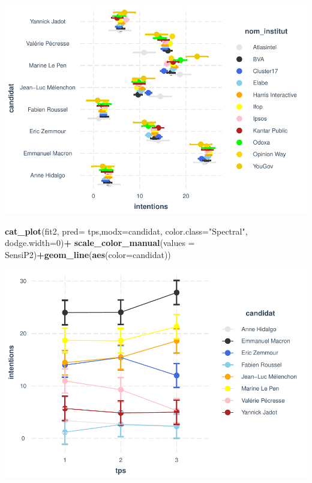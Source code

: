 \documentclass[
]{book}
\newenvironment{Shaded}{\begin{snugshade}}{\end{snugshade}}
\newcommand{\DataTypeTok}[1]{\textcolor[rgb]{0.13,0.29,0.53}{#1}}
\newcommand{\DecValTok}[1]{\textcolor[rgb]{0.00,0.00,0.81}{#1}}
\newcommand{\KeywordTok}[1]{\textcolor[rgb]{0.13,0.29,0.53}{\textbf{#1}}}
\newcommand{\NormalTok}[1]{#1}
\newcommand{\OperatorTok}[1]{\textcolor[rgb]{0.81,0.36,0.00}{\textbf{#1}}}
\newcommand{\StringTok}[1]{\textcolor[rgb]{0.31,0.60,0.02}{#1}}
\begin{document}
\includegraphics{bookdown-demo_files/figure-latex/biais-1.pdf}

\begin{Shaded}
\begin{Highlighting}[]
\KeywordTok{cat_plot}\NormalTok{(fit2, }\DataTypeTok{pred=}\NormalTok{ tps,}\DataTypeTok{modx=}\NormalTok{candidat, }\DataTypeTok{color.class=}\StringTok{"Spectral"}\NormalTok{, }\DataTypeTok{dodge.width=}\DecValTok{0}\NormalTok{)}\OperatorTok{+}
\StringTok{  }\KeywordTok{scale_color_manual}\NormalTok{(}\DataTypeTok{values =}\NormalTok{ SensiP2)}\OperatorTok{+}\KeywordTok{geom_line}\NormalTok{(}\KeywordTok{aes}\NormalTok{(}\DataTypeTok{color=}\NormalTok{candidat))}
\end{Highlighting}
\end{Shaded}

\includegraphics{bookdown-demo_files/figure-latex/biais-2.pdf}
\end{document}
